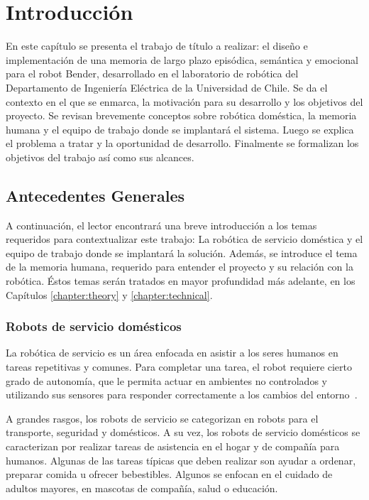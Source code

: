 \chapter{Introducción}\label{chapter:introduction}

En este capítulo se presenta el trabajo de título a realizar: el diseño e implementación de una memoria de largo plazo episódica, semántica y emocional para el robot Bender, desarrollado en el laboratorio de robótica del Departamento de Ingeniería Eléctrica de la Universidad de Chile. Se da el contexto en el que se enmarca, la motivación para su desarrollo y los objetivos del proyecto. Se revisan brevemente conceptos sobre robótica doméstica, la memoria humana y el equipo de trabajo donde se implantará el sistema. Luego se explica el problema a tratar y la oportunidad de desarrollo. Finalmente se formalizan los objetivos del trabajo así como sus alcances.


\section{Antecedentes Generales}

A continuación, el lector encontrará una breve introducción a los temas requeridos para contextualizar este trabajo: La robótica de servicio doméstica y el equipo de trabajo donde se implantará la solución. Además, se introduce el tema de la memoria humana, requerido para entender el proyecto y su relación con la robótica. Éstos temas serán tratados en mayor profundidad más adelante, en los Capítulos \ref{chapter:theory} y \ref{chapter:technical}.


\subsection{Robots de servicio domésticos}

La robótica de servicio es un área enfocada en asistir a los seres humanos en tareas repetitivas y comunes. Para completar una tarea, el robot requiere cierto grado de autonomía, que le permita actuar en ambientes no controlados y utilizando sus sensores para responder correctamente a los cambios del entorno~\cite{IFR}.

A grandes rasgos, los robots de servicio se categorizan en robots para el transporte, seguridad y domésticos. A su vez, los robots de servicio domésticos se caracterizan por realizar tareas de asistencia en el hogar y de compañía para humanos. Algunas de las tareas típicas que deben realizar son ayudar a ordenar, preparar comida u ofrecer bebestibles. Algunos se enfocan en el cuidado de adultos mayores, en mascotas de compañía, salud o educación.

